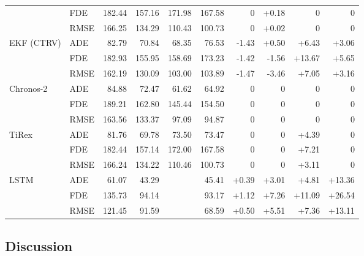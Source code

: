 \begin{table}[t]
\begin{tabular}{llrrrrrrrr}
& FDE  & 182.44 & 157.16 & 171.98 & 167.58 & 0 & +0.18 & 0 & 0 \\
& RMSE & 166.25 & 134.29 & 110.43 & 100.73 & 0 & +0.02 & 0 & 0 \\
\midrule
EKF (CTRV)          
& ADE  & 82.79 & 70.84 & 68.35 & 76.53 & -1.43 & +0.50 & +6.43 & +3.06 \\
& FDE  & 182.93 & 155.95 & 158.69 & 173.23 & -1.42 & -1.56 & +13.67 & +5.65 \\
& RMSE & 162.19 & 130.09 & 103.00 & 103.89 & -1.47 & -3.46 & +7.05 & +3.16 \\
\midrule
Chronos-2           
& ADE  & 84.88 & 72.47 & 61.62 & 64.92 & 0 & 0 & 0 & 0 \\
& FDE  & 189.21 & 162.80 & 145.44 & 154.50 & 0 & 0 & 0 & 0 \\
& RMSE & 163.56 & 133.37 & 97.09 & 94.87 & 0 & 0 & 0 & 0 \\
\midrule
TiRex               
& ADE  & 81.76 & 69.78 & 73.50 & 73.47 & 0 & 0 & +4.39 & 0 \\
& FDE  & 182.44 & 157.14 & 172.00 & 167.58 & 0 & 0 & +7.21 & 0 \\
& RMSE & 166.24 & 134.22 & 110.46 & 100.73 & 0 & 0 & +3.11 & 0 \\
\midrule
LSTM                

& ADE  & 61.07 & 43.29 & \cellcolor{cyan!15}{32.09} & 45.41 & +0.39 & +3.01 & \cellcolor{orange!15}+4.81 & \cellcolor{orange!15}+13.36 \\
& FDE  & 135.73 & 94.14 & \cellcolor{cyan!15}{70.23} & 93.17 & +1.12 & +7.26 & \cellcolor{orange!15}+11.09 & \cellcolor{orange!15}+26.54 \\
& RMSE & 121.45 & 91.59 & \cellcolor{cyan!15}{55.85} & 68.59 & +0.50 & +5.51 & \cellcolor{orange!15}+7.36 & \cellcolor{orange!15}+13.11 \\
\bottomrule
\end{tabular}
\end{table}

\FloatBarrier

\subsection{Discussion}

